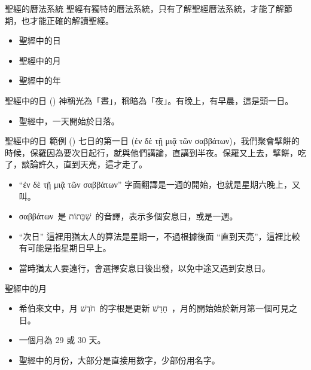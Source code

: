 \documentclass{beamer}
\newcommand{\parvspace}{\par\vspace{0.5em}}
\begin{document}
\begin{frame}{聖經的曆法系統}
  聖經有獨特的曆法系統，只有了解聖經曆法系統，才能了解節期，也才能正確的解讀聖經。\parvspace
  \begin{itemize}
    \item 聖經中的日
    \item 聖經中的月
    \item 聖經中的年
  \end{itemize}
\end{frame}

\begin{frame}{聖經中的日}
  () 神稱光為「晝」，稱暗為「夜」。\alert{有晚上，有早晨}，這是頭一日。\parvspace
  \begin{itemize}
    \item 聖經中，一天開始於日落\parencite{JewishDay}。
  \end{itemize}
\end{frame}

\begin{frame}{聖經中的日 \textemdash 範例}
  () 七日的第一日 (\textgreek{ἐν δὲ τῇ μιᾷ τῶν σαββάτων})，我們聚會擘餅的時候，保羅因為要次日起行，就與他們講論，直講到半夜。\textellipsis{}保羅又上去，擘餅，吃了，談論許久，直到天亮，這才走了。\parvspace
  \begin{itemize}
    \item “\textgreek{ἐν δὲ τῇ μιᾷ τῶν σαββάτων}” 字面翻譯是\alert{一週的開始}，也就是星期六晚上，又叫\textcite{MotzaeiShabbat}。
    \item \textgreek{σαββάτων}\ 是 \texthebrew{שַׁבָּתוֹת}\ 的音譯，表示多個安息日，或是一週。
    \item “次日” 這裡用猶太人的算法是星期一，不過根據後面 “直到天亮”，這裡比較有可能是指星期日早上。
    \item 當時猶太人要遠行，會選擇安息日後出發，以免中途又遇到安息日\parencite{TalmudShabbat-19a-8}。
  \end{itemize}
\end{frame}

\begin{frame}{聖經中的月}
  \begin{itemize}
    \item 希伯來文中，月 \texthebrew{חֹדֶשׁ}\ 的字根是更新 \texthebrew{חָדַשׁ}\ ，月的開始始於\alert{新月第一個可見之日}。
    \item 一個月為 \alert{29 或 30 天}。
    \item 聖經中的月份，大部分是直接用數字，少部份用名字。
  \end{itemize}
\end{frame}
\end{document}
